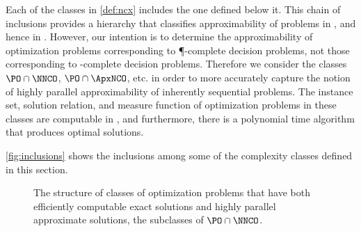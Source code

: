 \documentclass[]{article}
\begin{document}
Each of the classes in \autoref{def:ncx} includes the one defined below it.
This chain of inclusions provides a hierarchy that classifies approximability of problems in \NNCO{}, and hence in \NPO.
However, our intention is to determine the approximability of optimization problems corresponding to \P-complete decision problems, not those corresponding to \NP-complete decision problems.
Therefore we consider the classes $\PO \cap \NNCO$, $\PO \cap \ApxNCO$, etc. in order to more accurately capture the notion of highly parallel approximability of inherently sequential problems.
The instance set, solution relation, and measure function of optimization problems in these classes are computable in \NC{}, and furthermore, there is a polynomial time algorithm that produces optimal solutions.

\autoref{fig:inclusions} shows the inclusions among some of the complexity classes defined in this section.
\begin{figure}
  \caption{%
    The structure of classes of optimization problems that have both efficiently computable exact solutions and highly parallel approximate solutions, the subclasses of $\PO \cap \NNCO$.
    \label{fig:inclusions}}
  \begin{center}
  \end{center}
\end{figure}
\end{document}
